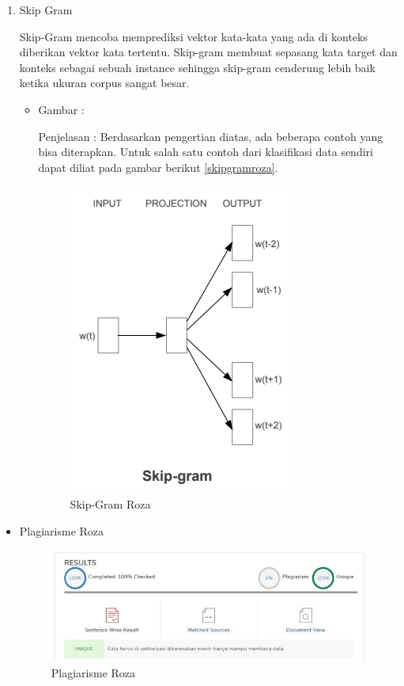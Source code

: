 \begin{enumerate}
\item Skip Gram
\par Skip-Gram mencoba memprediksi vektor kata-kata yang ada di konteks diberikan vektor kata tertentu. Skip-gram membuat sepasang kata target dan konteks sebagai sebuah instance sehingga skip-gram cenderung lebih baik ketika ukuran corpus sangat besar.
\par
\begin{itemize}
\item Gambar :
\par Penjelasan : Berdasarkan pengertian diatas, ada beberapa contoh yang bisa diterapkan. Untuk salah satu contoh dari klasifikasi data sendiri dapat diliat pada gambar berikut \ref{skipgramroza}.
\begin{figure}[!hbtp]
\centering
\includegraphics[scale=0.5]{figures/skipgramroza.png}
\caption{Skip-Gram Roza}
\label{text-fadila}
\end{figure}
\end{itemize}
\end{enumerate}

\begin{itemize}
\item Plagiarisme Roza
\begin{figure}[!hbtp]
\centering
\includegraphics[scale=0.5]{figures/plagiarismeroza.jpg}
\caption{Plagiarisme Roza}
\label{text-fadila}
\end{figure}
\end{itemize}

